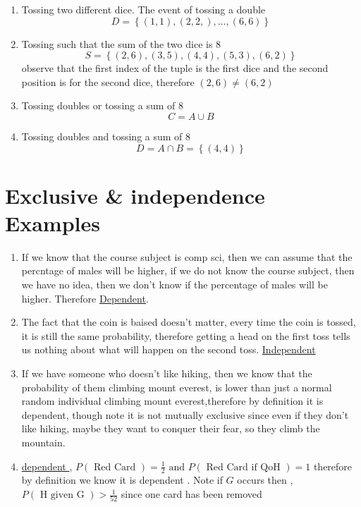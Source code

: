 \documentclass[11pt]{book}
\begin{document}
\begin{enumerate}
    \item Tossing two different dice. The event of tossing a double
        \[
            D= \left\{ \left( 1,1 \right) , \left( 2,2, \right) ,\ldots , \left( 6,6 \right)  \right\} 
        \]
    \item Tossing such that the sum of the two dice is 8
        \[
            S = \left\{ \left( 2,6 \right) ,\left( 3,5 \right) ,\left( 4,4 \right) , \left( 5,3 \right) ,\left( 6,2 \right)  \right\} 
        \]
        observe that the first index of the tuple is the first dice and the second position is for the second dice, therefore $\left( 2,6 \right) \neq \left( 6,2 \right) $ 
    \item Tossing doubles or tossing a sum of 8
        \[
        C= A\cup B 
        \]
    \item Tossing doubles and tossing a sum of 8
        \[
            D= A\cap B= \left\{ \left( 4,4 \right)  \right\} 
        \]
        
\end{enumerate}


\section{Exclusive \& independence Examples}%
\label{sec:exclusive_&_independence_examples}

\begin{enumerate}[label=\alph*)]
    \item If we know that the course subject is comp sci, then we can assume that the percntage of males will be higher, if we do not know the course subject, then we have no idea, then we don't know if the percentage of males will be higher. Therefore \underline{Dependent}. 
    \item The fact that the coin is baised doesn't matter, every time the coin is tossed, it is still the same probability, therefore getting a head on the first toss tells us nothing about what will happen on the second toss. \underline{Independent} 
    \item If we have someone who doesn't like hiking, then we know that the probability of them climbing mount everest, is lower than just a normal random individual climbing mount everest,therefore by definition it is dependent, though note it is not mutually exclusive since even if they don't like hiking, maybe they want to conquer their fear, so they climb the mountain.
    \item \underline{dependent }, $P\left(\text{ Red Card } \right)= \frac{1}{2} \text{ and } P\left(\text{ Red Card if QoH } \right) = 1$ therefore by definition we know it is dependent . Note if $G$ occurs then , $P\left(\text{ H given G } \right) > \frac{1}{52} $ since one card has been removed
\end{enumerate}
\end{document}
